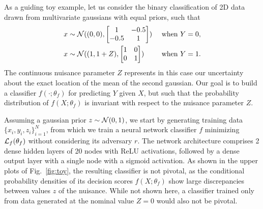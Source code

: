 \documentclass[twocolumn,superscriptaddress,aps]{revtex4-1}
\theoremstyle{plain}
\begin{document}
As a guiding toy example, let us consider the binary classification of 2D
data drawn from multivariate gaussians with equal priors, such that
\begin{align}
    x &\sim {\cal N}((0,0), \begin{bmatrix}
                              1 & -0.5 \\
                              -0.5 & 1
                            \end{bmatrix}) &\text{ when } Y=0, \\
    x &\sim {\cal N}((1,1+Z),  \begin{bmatrix}
                              1 & 0 \\
                              0 & 1
                             \end{bmatrix}) &\text{ when } Y=1.
\end{align}
The continuous nuisance parameter $Z$ represents in this case our
uncertainty about the exact location of the mean of the second gaussian. Our goal is to
build a classifier $f(\cdot;\theta_f)$ for predicting $Y$ given $X$, but such that
the probability distribution of $f(X;\theta_f)$ is invariant with respect to the
nuisance parameter $Z$.

Assuming a gaussian prior $z \sim {\cal N}(0,1)$, we start by
generating training data $\{ x_i, y_i, z_i \}_{i=1}^N$, from which we train a
neural network classifier $f$ minimizing ${\cal L}_f(\theta_f)$ without
considering its adversary $r$. The network architecture comprises 2 dense hidden layers of 20
nodes with ReLU activations, followed  by a dense output layer with a single
node with a sigmoid activation. As shown in the upper plots of
Fig.~\ref{fig:toy}, the resulting classifier is not pivotal, as the
conditional probability densities of its decision scores $f(X;\theta_f)$ show
large discrepancies between values $z$ of the nuisance. While not shown here, a
classifier trained only from data generated at the nominal value $Z=0$ would
also not be pivotal.
\end{document}
